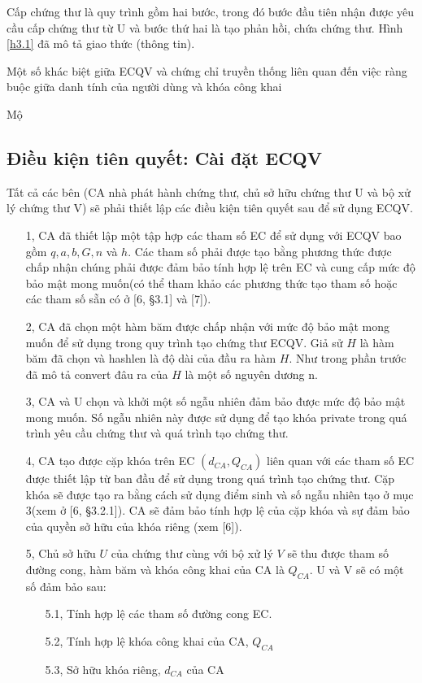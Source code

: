 \documentclass[a4paper,12pt]{report}
\begin{document}
Cấp chứng thư là quy trình gồm hai bước, trong đó bước đầu tiên nhận được yêu cầu cấp chứng thư từ U và bước thứ hai là tạo phản hồi, chứa chứng thư. Hình \ref{h3.1} đã mô tả giao thức (thông tin).

Một số khác biệt giữa ECQV và chứng chỉ truyền thống liên quan đến việc ràng buộc giữa danh tính của người dùng và khóa công khai

Mộ
\subsection{Điều kiện tiên quyết: Cài đặt ECQV}
Tất cả các bên (CA nhà phát hành chứng thư, chủ sở hữu chứng thư U và bộ xử lý chứng thư V) sẽ phải thiết lập các điều kiện tiên quyết sau để sử dụng ECQV.
\begin{itemize}
\item[1, ] CA đã thiết lập một tập hợp các tham số EC để sử dụng với ECQV bao gồm $q, a, b, G, n$ và $h$. Các tham số phải được tạo bằng phương thức được chấp nhận chúng phải được đảm bảo tính hợp lệ trên EC và cung cấp mức độ bảo mật mong muốn(có thể tham khảo các phương thức tạo tham số hoặc các tham số sẵn có ở [6, §3.1] và [7]).
\item[2, ] CA đã chọn một hàm băm được chấp nhận với mức độ bảo mật mong muốn để sử dụng trong quy trình tạo chứng thư ECQV. Giả sử $H$ là hàm băm đã chọn và hashlen là độ dài của đầu ra hàm $H$. Như trong phần trước đã mô tả convert đâu ra của $H$ là một số nguyên dương n.
\item[3, ] CA và U chọn và khởi một số ngẫu nhiên đảm bảo được mức độ bảo mật mong muốn. Số ngẫu nhiên này được sử dụng để tạo khóa private trong quá trình yêu cầu chứng thư và quá trình tạo chứng thư.
\item[4, ] CA tạo được cặp khóa trên EC $(d_{CA}, Q_{CA})$ liên quan với các tham số EC được thiết lập từ ban đầu để sử dụng trong quá trình tạo chứng thư. Cặp khóa sẽ được tạo ra bằng cách sử dụng điểm  sinh và số ngẫu nhiên tạo ở mục 3(xem ở [6, §3.2.1]). CA sẽ đảm bảo tính hợp lệ của cặp khóa và sự đảm bảo của quyền sở hữu của khóa riêng (xem [6]).
\item[5, ] Chủ sở hữu $U$ của chứng thư cùng với bộ xử lý $V$ sẽ thu được tham số đường cong, hàm băm và khóa công khai của CA là $Q_{CA}$. U và V sẽ có một số đảm bảo sau:
\begin{itemize}
\item[5.1, ] Tính hợp lệ các tham số đường cong EC.
\item[5.2, ] Tính hợp lệ khóa công khai của CA, $Q_{CA}$
\item[5.3, ] Sở hữu khóa riêng, $d_{CA}$ của CA
\end{itemize}
\end{itemize}
\end{document}
